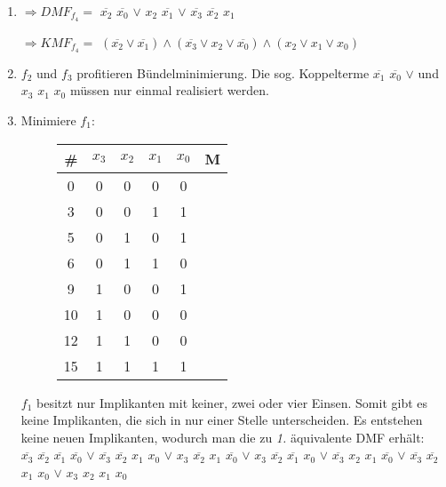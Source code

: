 \documentclass[a4paper]{scrartcl}
\begin{document}
\begin{enumerate}
		\item 
		$\Rightarrow DMF_{f_4} =$ 
		$\overline{x_2}$ $\overline{x_0}$ $\vee$
		$x_2$ $\overline{x_1}$ $\vee$
		$\overline{x_3}$ $\overline{x_2}$ $x_1$
		
		$\Rightarrow KMF_{f_4} =$ 
		$(\overline{x_2} \vee \overline{x_1}) \wedge 
		(\overline{x_3} \vee x_2 \vee \overline{x_0}) \wedge 
		(x_2 \vee x_1 \vee x_0)$
		
		
		\item $f_2$ und $f_3$ profitieren Bündelminimierung. Die sog. Koppelterme $\overline{x_1}$ $\overline{x_0}$ $\vee$
		 und $x_3$ $x_1$ $x_0$ müssen nur einmal realisiert werden. \\
		 
		 \item Minimiere $f_1$:
		 
		 \begin{minipage}{0.4\linewidth}
		 	\begin{figure}[H]
		 		\begin{tabular}{c|cccc|c}
		 			\# & $x_3$ & $x_2$ & $x_1$ & $x_0$ & M \\
		 			\hline
		 			\hline
		 			0 & 0 & 0 & 0 & 0 & \\
		 			\hline
		 			3 & 0 & 0 & 1 & 1 & \\
		 			5 & 0 & 1 & 0 & 1 & \\
		 			6 & 0 & 1 & 1 & 0 & \\
		 			9 & 1 & 0 & 0 & 1 & \\
		 			10 & 1 & 0 & 0 & 0 & \\
		 			12 & 1 & 1 & 0 & 0 & \\
		 			\hline
		 			15 & 1 & 1 & 1 & 1 & 
		 		\end{tabular}
		 	\end{figure}
		 \end{minipage}
		 \begin{minipage}{0.5\linewidth}
		 	$f_1$ besitzt nur Implikanten mit keiner, zwei oder vier Einsen. Somit gibt es keine Implikanten, die sich in nur einer Stelle unterscheiden. Es entstehen keine neuen Implikanten, wodurch man die zu \textit{1.} äquivalente DMF erhält: \\ 
		 	$\overline{x_3}$ $\overline{x_2}$ $\overline{x_1}$ $\overline{x_0}$ $\vee$
		 	$\overline{x_3}$ $\overline{x_2}$ $x_1$ $x_0$ $\vee$
		 	$x_3$ $\overline{x_2}$ $x_1$ $\overline{x_0}$ $\vee$
		 	$x_3$ $\overline{x_2}$ $\overline{x_1}$ $x_0$ $\vee$
		 	$\overline{x_3}$ $x_2$ $x_1$ $\overline{x_0}$ $\vee$
		 	$\overline{x_3}$ $\overline{x_2}$ $x_1$ $x_0$ $\vee$
		 	$x_3$ $x_2$ $x_1$ $x_0$
		 \end{minipage}
		 
	\end{enumerate}
	
	
	
\end{document}
